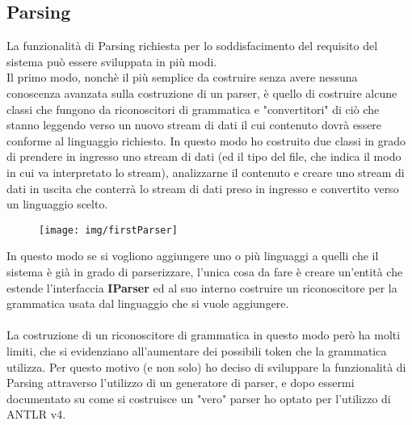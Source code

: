 \documentclass{article}
\begin{document}
  \subsection{Parsing}
  La funzionalità di Parsing richiesta per lo soddisfacimento del requisito del sistema può essere sviluppata in più modi.\\Il primo modo, nonchè il più
  semplice da costruire senza avere nessuna conoscenza avanzata sulla costruzione di un parser, è quello di costruire alcune classi che fungono da riconoscitori di
  grammatica e "convertitori" di ciò che stanno leggendo verso un nuovo stream di dati il cui contenuto dovrà essere conforme al linguaggio richiesto. In questo
  modo ho costruito due classi in grado di prendere in ingresso uno stream di dati (ed il tipo del file, che indica il modo in cui va interpretato lo stream),
  analizzarne il contenuto e creare uno stream di dati in uscita che conterrà lo stream di dati preso in ingresso e convertito verso un linguaggio scelto.
  \begin{figure}[H]
    \centering
    \texttt{[image: img/firstParser]}
  \end{figure}
  In questo modo se si vogliono aggiungere uno o più linguaggi a quelli che il sistema è già in grado di parserizzare, l'unica cosa da fare è creare un'entità
  che estende l'interfaccia \textbf{IParser} ed al suo interno costruire un riconoscitore per la grammatica usata dal linguaggio che si vuole aggiungere.\\
  \\La costruzione di un riconoscitore di  grammatica in questo modo però ha molti limiti, che si evidenziano all'aumentare dei possibili token che la grammatica
  utilizza. Per questo motivo (e non solo) ho deciso di sviluppare la funzionalità di Parsing attraverso l'utilizzo di un generatore di parser, e dopo essermi
  documentato su come si costruisce un "vero" parser ho optato per l'utilizzo di ANTLR v4.
\end{document}
